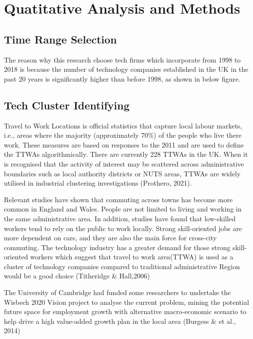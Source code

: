 \documentclass[
  12pt,
  oneside]{book}
\begin{document}
\hypertarget{quatitative-analysis-and-methods}{%
\section{Quatitative Analysis and Methods}\label{quatitative-analysis-and-methods}}

\hypertarget{time-range-selection}{%
\subsection{Time Range Selection}\label{time-range-selection}}

The reason why this research choose tech firms which incorporate from 1998 to 2018 is because the number of technology companies established in the UK in the past 20 years is significantly higher than before 1998, as shown in below figure.

\hypertarget{tech-cluster-identifying}{%
\subsection{Tech Cluster Identifying}\label{tech-cluster-identifying}}

Travel to Work Locations is official statistics that capture local labour markets, i.e., areas where the majority (approximately 70\%) of the people who live there work. These measures are based on responses to the 2011 and are used to define the TTWAs algorithmically. There are currently 228 TTWAs in the UK. When it is recognised that the activity of interest may be scattered across administrative boundaries such as local authority districts or NUTS areas, TTWAs are widely utilised in industrial clustering investigations (Prothero, 2021).

Relevant studies have shown that commuting across towns has become more common in England and Wales. People are not limited to living and working in the same administrative area. In addition, studies have found that low-skilled workers tend to rely on the public to work locally. Strong skill-oriented jobs are more dependent on cars, and they are also the main force for cross-city commuting. The technology industry has a greater demand for those strong skill-oriented workers which suggest that travel to work area(TTWA) is used as a cluster of technology companies compared to traditional administrative Region would be a good choice (Titheridge \& Hall,2006)

The University of Cambridge had funded some researchers to undertake the Wisbech 2020 Vision project to analyse the current problem, mining the potential future space for employment growth with alternative macro-economic scenario to help drive a high value-added growth plan in the local area (Burgess \& et al., 2014)
\end{document}
